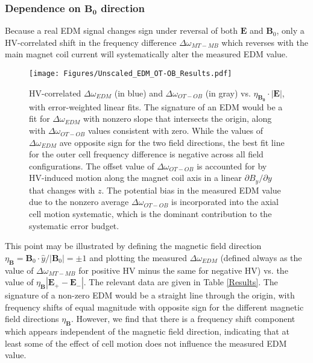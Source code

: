 \documentclass [10pt, twoside] {uwthesis}[2012/04/02]
\begin{document}
\subsubsection{Dependence on $\mathbf{B_0}$ direction}
Because a real EDM signal changes sign under reversal of both $\mathbf{E}$ and $\mathbf{B}_0$, only a HV-correlated shift in the frequency difference $\Delta\omega_{MT-MB}$ which reverses with the main magnet coil current will systematically alter the measured EDM value.
\begin{figure}
\begin{center}
\texttt{[image: Figures/Unscaled\_EDM\_OT-OB\_Results.pdf]}
\end{center}
\caption[$\Delta\omega_{EDM}$ and $\Delta\omega_{OT-OB}$ frequency shifts vs. field configuration]
{\narrower HV-correlated $\Delta\omega_{EDM}$ (in blue) and $\Delta\omega_{OT-OB}$ (in gray) vs. $\eta_{\mathbf{B_0}}\cdot |\mathbf{E}|$, with error-weighted linear fits. The signature of an EDM would be a fit for $\Delta\omega_{EDM}$ with nonzero slope that intersects the origin, along with $\Delta\omega_{OT-OB}$ values consistent with zero. While the values of $\Delta\omega_{EDM}$ ave opposite sign for the two field directions, the best fit line for the outer cell frequency difference is negative across all field configurations. The offset value of $\Delta\omega_{OT-OB}$ is accounted for by HV-induced motion along the magnet coil axis in a linear $\partial B_y/\partial y$ that changes with $z$. The potential bias in the measured EDM value due to the nonzero average $\Delta\omega_{OT-OB}$ is incorporated into the axial cell motion systematic, which is the dominant contribution to the systematic error budget.}
\label{Frequency_Shifts}
\end{figure}
This point may be illustrated by defining the magnetic field direction $\eta_{\mathbf{B}} = \mathbf{B}_0 \cdot \hat{y}/|\mathbf{B}_0| = \pm 1$ and plotting the measured $\Delta \omega_{EDM}$ (defined always as the value of $\Delta\omega_{MT-MB}$ for positive HV minus the same for negative HV) vs. the value of $\eta_{\mathbf{B}}|\mathbf{E_+}-\mathbf{E_-}|$. The relevant data are given in Table \ref{Results}. The signature of a non-zero EDM would be a straight line through the origin, with frequency shifts of equal magnitude with opposite sign for the different magnetic field directions $\eta_{\mathbf{B}}$. However, we find that there is a frequency shift component which appears independent of the magnetic field direction, indicating that at least some of the effect of cell motion does not influence the measured EDM value.
\end{document}
